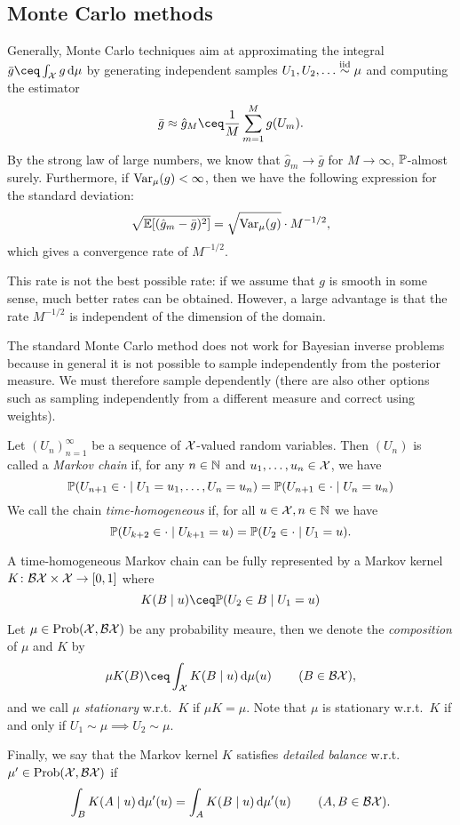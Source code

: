 \subsection{Monte Carlo methods}
Generally, Monte Carlo techniques aim at approximating the integral $\bar g \ceq \int_\XX g \dd{\mu}$ by generating independent samples $U_1, U_2, \dotsc \overset{\mathrm{iid}}\sim \mu$ and computing the estimator
\[
\bar g \approx \hat g_M \ceq \frac1M \sum_{m=1}^M  g(U_m). 
\]
By the strong law of large numbers, we know that $\hat g_m \to \bar g$ for $M \to\infty$, $\mathbb P$-almost surely. Furthermore, if $\operatorname{Var}_\mu(g)< \infty$, then we have the following expression for the standard deviation:
\[
\sqrt{\mathbb E[(\hat g_m - \bar g)^2]} = \sqrt{\operatorname{Var}_\mu(g)} \cdot M^{-1/2},
\]
which gives a convergence rate of $M^{-1/2}$. 

This rate is not the best possible rate: if we assume that $g$ is smooth in some sense, much better rates can be obtained. However, a large advantage is that the rate $M^{-1/2}$ is independent of the dimension of the domain. 

The standard Monte Carlo method does not work for Bayesian inverse problems because in general it is not possible to sample independently from the posterior measure. We must therefore sample dependently (there are also other options such as sampling independently from a different measure and correct using weights). 

\begin{definition}
	Let $(U_n)_{n=1}^\infty$ be a sequence of $\mathcal X$-valued random variables. Then $(U_n)$ is called a \emph{Markov chain} if, for any $n \in \mathbb N$ and $u_1, \dotsc, u_n \in \mathcal X$, we have
	\[
	\mathbb P(U_{n+1} \in \cdot \mid U_1 = u_1, \dotsc, U_n = u_n) = \mathbb P(U_{n+1} \in \cdot \mid U_n = u_n)
	\]
	We call the chain \emph{time-homogeneous} if, for all $u \in \mathcal X, n \in \mathbb N$ we have
	\[
	 \mathbb P(U_{k+2} \in \cdot \mid U_{k+1} = u) = \mathbb P(U_2 \in \cdot \mid U_1 = u). 
	\]
	
	A time-homogeneous Markov chain can be fully represented by a Markov kernel $K \colon \mathcal B\mathcal X \times \mathcal X \to [0, 1]$ where
	\[
	K(B \mid u) \ceq \PP(U_2 \in B \mid U_1 = u)
	\]
	
	Let $\mu \in \operatorname{Prob}(\mathcal X, \mathcal B\mathcal X)$ be any probability meaure, then we denote the \emph{composition} of $\mu$ and $K$ by
	\[
	\mu K(B) \ceq \int_\XX K(B \mid u) \dd{\mu(u)} \qquad(B \in \BB\XX),
	\]
	and we call $\mu$ \emph{stationary} w.r.t.\ $K$ if $\mu K = \mu$. Note that $\mu$ is stationary w.r.t.\ $K$ if and only if $U_1 \sim \mu \implies U_2 \sim \mu$. 
	
	Finally, we say that the Markov kernel $K$ satisfies \emph{detailed balance} w.r.t.\ $\mu' \in \operatorname{Prob}(\mathcal X, \mathcal B\mathcal X)$ if
	\[
	\int_B K(A \mid u) \dd{\mu'(u)} = \int_A K(B \mid u) \dd{\mu'(u)} \qquad(A, B \in \mathcal B\mathcal X). 
	\]
\end{definition}

